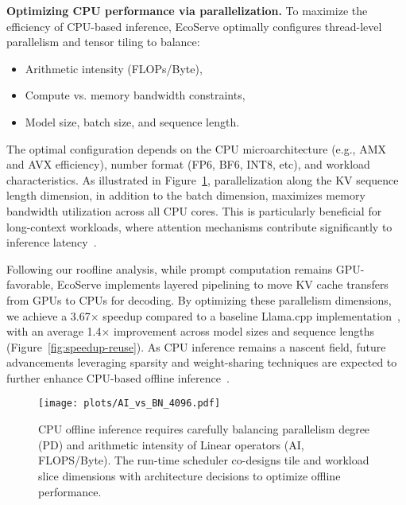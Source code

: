 \textbf{Optimizing CPU performance via parallelization.}
To maximize the efficiency of CPU-based inference, EcoServe optimally configures thread-level parallelism and tensor tiling to balance:
\begin{itemize}
    \item Arithmetic intensity (FLOPs/Byte),
    \item Compute vs. memory bandwidth constraints,
    \item Model size, batch size, and sequence length.
\end{itemize}
The optimal configuration depends on the CPU microarchitecture (e.g., AMX and AVX efficiency), number format (FP6, BF6, INT8, etc), and workload characteristics.
As illustrated in Figure~\ref{fig:gemm-ai}, {parallelization along the KV sequence length dimension, in addition to the batch dimension, maximizes memory bandwidth utilization across all CPU cores.} 
This is particularly beneficial for long-context workloads, where attention mechanisms contribute significantly to inference latency~\cite{flashdecoding2023,flashinfer,dao2022flashattention,dao2023flashattention,hong2023flashdecoding++}.

Following our {roofline analysis}, while prompt computation remains GPU-favorable, EcoServe implements {layered pipelining} to move KV cache transfers from GPUs to CPUs for decoding.
By optimizing these parallelism dimensions, we achieve a {3.67$\times$ speedup} compared to a baseline Llama.cpp implementation~\cite{llama_cpp}, with an average {1.4$\times$ improvement} across model sizes and sequence lengths (Figure~\ref{fig:speedup-reuse}).
As CPU inference remains a nascent field, future advancements leveraging sparsity and weight-sharing techniques are expected to further enhance CPU-based offline inference~\cite{song2023powerinfer,zhang2024h2o,Liu2023DejaVu}.

\begin{figure}[!t]
    \centering
    \texttt{[image: plots/AI\_vs\_BN\_4096.pdf]} 
    \vspace{-1em}
    \caption{CPU offline inference requires carefully balancing parallelism degree (PD) and arithmetic intensity of Linear operators (AI, FLOPS/Byte). The run-time scheduler co-designs tile and workload slice dimensions with architecture decisions to optimize offline performance.}
    \label{fig:gemm-ai}
    \vspace{-1.2em}
\end{figure}

